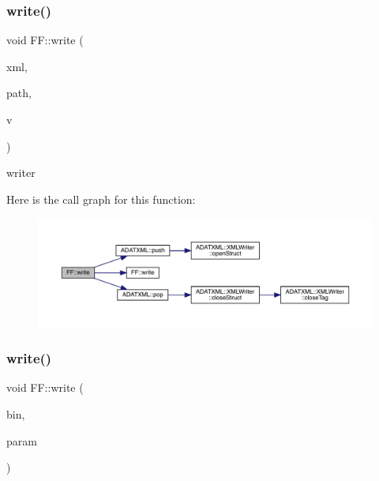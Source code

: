 \subsubsection{\texorpdfstring{write()}{write()}\hspace{0.1cm}{\footnotesize\ttfamily [7/13]}}
{\footnotesize\ttfamily void F\+F\+::write (\begin{DoxyParamCaption}\item[{X\+M\+L\+Writer \&}]{xml,  }\item[{const std\+::string \&}]{path,  }\item[{const \mbox{\hyperlink{classFF_1_1DiscoValOperator__t}{Disco\+Val\+Operator\+\_\+t}} \&}]{v }\end{DoxyParamCaption})}



writer 

Here is the call graph for this function\+:
\nopagebreak
\begin{figure}[H]
\begin{center}
\leavevmode
\includegraphics[width=350pt]{d5/da6/namespaceFF_a0c22ea2c009e3006aa0f745b9a3e2cc2_cgraph}
\end{center}
\end{figure}
\mbox{\label{namespaceFF_a78fdf587c961ada1987ee8f443e3d961}} 
\subsubsection{\texorpdfstring{write()}{write()}\hspace{0.1cm}{\footnotesize\ttfamily [8/13]}}
{\footnotesize\ttfamily void F\+F\+::write (\begin{DoxyParamCaption}\item[{\mbox{\hyperlink{classADATIO_1_1BinaryWriter}{Binary\+Writer}} \&}]{bin,  }\item[{const \mbox{\hyperlink{structFF_1_1KeyHadron1PtCorr__t}{Key\+Hadron1\+Pt\+Corr\+\_\+t}} \&}]{param }\end{DoxyParamCaption})}



